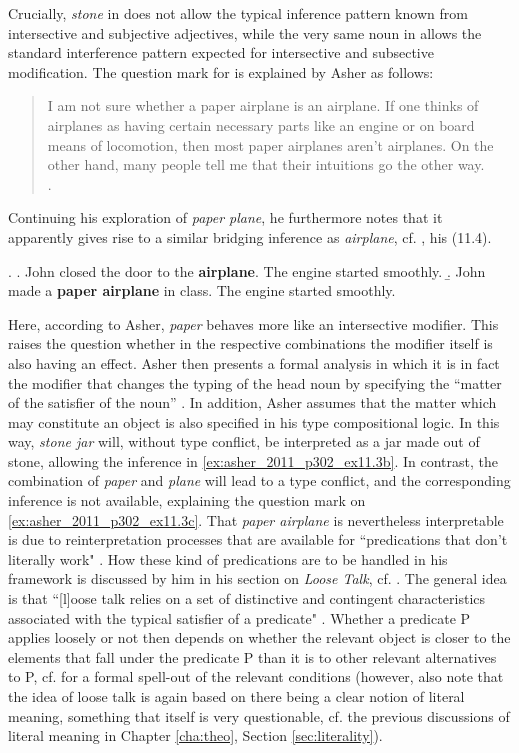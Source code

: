\pagebreak[4]
Crucially, \emph{stone} in \Last[a] does not allow the typical inference
pattern known from intersective and subjective adjectives, while the
very same noun in \Last[b] allows the standard interference pattern
expected for intersective and subsective modification. 
The question mark for \Last[c] is explained by Asher as follows:
\begin{quotation}
I am not sure whether a paper airplane is an airplane. If one thinks of
airplanes as having certain necessary parts like an engine or on board
means of locomotion, then most paper airplanes aren't airplanes. On
the other hand, many people tell me that their intuitions go the other
way.\\\citep[302]{Asher:2011}. 
\end{quotation}
Continuing his exploration of
\emph{paper plane}, he furthermore notes that it apparently gives rise
to a similar bridging inference as \emph{airplane}, cf. \Next, his
(11.4).

\ex. \label{ex:asher_2011_p302_ex11.4}
\a. John closed the door to the \textbf{airplane}. The engine started smoothly.
\b. John made a \textbf{paper airplane} in class. The engine started smoothly.

Here, according to Asher, \emph{paper} behaves more like an intersective
modifier. This raises the question whether in the respective
combinations the modifier itself is also having an effect. Asher then
presents a formal analysis in which it is in fact the modifier that
 changes the typing of the head noun by specifying the ``matter of
the satisfier of the noun'' \citep[304]{Asher:2011}. In addition,
Asher assumes that the matter which may constitute an object is also
specified in his type compositional logic. In this way, \emph{stone
  jar} will, without type conflict, be interpreted as a jar made out
of stone, allowing the inference in
\ref{ex:asher_2011_p302_ex11.3b}. In contrast, the combination of
\emph{paper} and \emph{plane} will lead to a type conflict, and the
corresponding inference is not available, explaining the question mark
on \ref{ex:asher_2011_p302_ex11.3c}. That \emph{paper airplane} is
nevertheless interpretable is due to reinterpretation processes that
are available for ``predications that don't literally work"
\citet[305]{Asher:2011}. How these kind of predications are to be
handled in his framework is discussed by him in his section on
\emph{Loose Talk}, cf. \citet[305--309]{Asher:2011}. The general idea
is that ``[l]oose talk relies on a set of distinctive and contingent
characteristics associated with the typical satisfier of a predicate"
\citep[308]{Asher:2011}. Whether a predicate P applies loosely or not
then depends on whether the relevant object is closer to the elements
that fall under the predicate P than it is to other relevant
alternatives to P, cf.  \citet[308]{Asher:2011} for a formal spell-out
of the relevant conditions (however, also note that the idea of loose
talk is again based on there being a clear notion of 
literal meaning, something that itself is very questionable,
cf. the previous discussions of literal meaning in Chapter
\ref{cha:theo}, Section \ref{sec:literality}).

